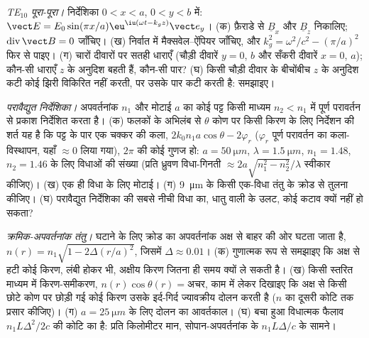 \begin{exercise}[$\star\star\star$]\label{exo:b2:guided-waves:10}
\emph{TE$_{10}$ पूरा-पूरा।} निर्देशिका $0 < x < a$, $0 < y < b$ में: $\vect E =
E_0\sin(\pi x/a)\eu^{\iu(\omega t - k_gz)}\vect e_y$। (क) फ़ैराडे से $\underline B_x$
और $\underline B_z$ निकालिए; $\operatorname{div}\vect B = 0$ जाँचिए। (ख) निर्वात में
मैक्सवेल--ऐंपियर जाँचिए, और $k_g^2 = \omega^2/c^2 - (\pi/a)^2$ फिर से पाइए। (ग) चारों
दीवारों पर सतही धाराएँ (चौड़ी दीवारें $y = 0$, $b$ और सँकरी दीवारें $x = 0$,
$a$); कौन-सी धाराएँ $z$ के अनुदिश बहती हैं, कौन-सी पार? (घ) किसी चौड़ी
दीवार के बीचोंबीच $z$ के अनुदिश कटी कोई झिरी विकिरित नहीं करती, पर उसके
पार कटी करती है: समझाइए।
\end{exercise}

\begin{exercise}[$\star\star\star$]\label{exo:b2:guided-waves:11}
\emph{परावैद्युत निर्देशिका।} अपवर्तनांक $n_1$ और मोटाई $a$ का कोई पट्ट किसी
माध्यम $n_2 < n_1$ में पूर्ण परावर्तन से प्रकाश निर्देशित करता है। (क) फलकों के
अभिलंब से $\theta$ कोण पर किसी किरण के लिए निर्देशन की शर्त यह है कि
पट्ट के पार एक चक्कर की कला, $2k_0n_1a\cos\theta - 2\varphi_r$ ($\varphi_r$
पूर्ण परावर्तन का कला-विस्थापन, यहाँ $\approx 0$ लिया गया), $2\pi$ की कोई
गुणज हो: $a = \qty{50}{\micro m}$, $\lambda = \qty{1.5}{\micro m}$,
$n_1 = 1.48$, $n_2 = 1.46$ के लिए विधाओं की संख्या (प्रति ध्रुवण विधा-गिनती
$\approx 2a\sqrt{n_1^2 - n_2^2}/\lambda$ स्वीकार कीजिए)। (ख) एक ही विधा के लिए मोटाई।
(ग) \qty{9}{\micro m} के किसी एक-विधा तंतु के क्रोड से तुलना कीजिए। (घ) परावैद्युत
निर्देशिका की सबसे नीची विधा का, धातु वाली के उलट, कोई कटाव क्यों नहीं हो सकता?
\end{exercise}

\begin{exercise}[$\star\star\star$]\label{exo:b2:guided-waves:12}
\emph{क्रमिक-अपवर्तनांक तंतु।}  घटाने के लिए क्रोड का
अपवर्तनांक अक्ष से बाहर की ओर घटता जाता है, $n(r) = n_1\sqrt{1 - 2\Delta(r/a)^2}$, जिसमें
$\Delta \approx 0.01$। (क) गुणात्मक रूप से समझाइए कि अक्ष से हटी कोई किरण, लंबी
होकर भी, अक्षीय किरण जितना ही समय क्यों ले सकती है। (ख) किसी स्तरित माध्यम
में किरण-समीकरण, $n(r)\cos\theta(r) = \text{अचर}$, काम में लेकर दिखाइए कि
अक्ष से किसी छोटे कोण पर छोड़ी गई कोई किरण उसके इर्द-गिर्द ज्यावक्रीय
दोलन करती है ($n$ का दूसरी कोटि तक प्रसार कीजिए)। (ग) $a = \qty{25}{\micro m}$
के लिए दोलन का आवर्तकाल। (घ) बचा हुआ विधात्मक फैलाव
$n_1L\Delta^2/2c$ की कोटि का है: प्रति किलोमीटर मान, सोपान-अपवर्तनांक के
$n_1L\Delta/c$ के सामने।
\end{exercise}

